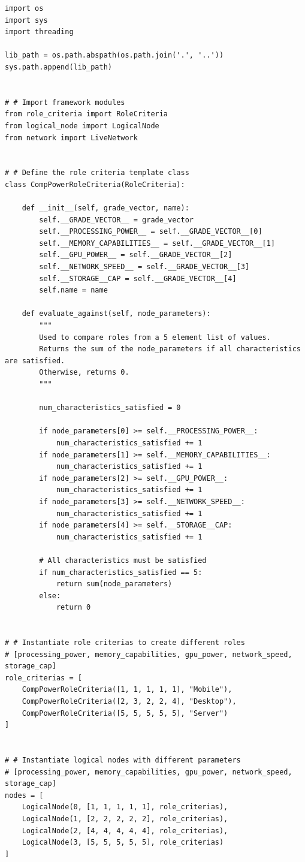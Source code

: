 \documentclass[11pt]{article}
\begin{document}
\lstset{frame=single, caption=Example Framework Listing in Python}
\begin{lstlisting}
import os
import sys
import threading

lib_path = os.path.abspath(os.path.join('.', '..'))
sys.path.append(lib_path)


# # Import framework modules
from role_criteria import RoleCriteria
from logical_node import LogicalNode
from network import LiveNetwork


# # Define the role criteria template class
class CompPowerRoleCriteria(RoleCriteria):

    def __init__(self, grade_vector, name):
        self.__GRADE_VECTOR__ = grade_vector
        self.__PROCESSING_POWER__ = self.__GRADE_VECTOR__[0]
        self.__MEMORY_CAPABILITIES__ = self.__GRADE_VECTOR__[1]
        self.__GPU_POWER__ = self.__GRADE_VECTOR__[2]
        self.__NETWORK_SPEED__ = self.__GRADE_VECTOR__[3]
        self.__STORAGE__CAP = self.__GRADE_VECTOR__[4]
        self.name = name

    def evaluate_against(self, node_parameters):
        """
        Used to compare roles from a 5 element list of values.
        Returns the sum of the node_parameters if all characteristics are satisfied.
        Otherwise, returns 0.
        """

        num_characteristics_satisfied = 0

        if node_parameters[0] >= self.__PROCESSING_POWER__:
            num_characteristics_satisfied += 1
        if node_parameters[1] >= self.__MEMORY_CAPABILITIES__:
            num_characteristics_satisfied += 1
        if node_parameters[2] >= self.__GPU_POWER__:
            num_characteristics_satisfied += 1
        if node_parameters[3] >= self.__NETWORK_SPEED__:
            num_characteristics_satisfied += 1
        if node_parameters[4] >= self.__STORAGE__CAP:
            num_characteristics_satisfied += 1

        # All characteristics must be satisfied
        if num_characteristics_satisfied == 5:
            return sum(node_parameters)
        else:
            return 0


# # Instantiate role criterias to create different roles
# [processing_power, memory_capabilities, gpu_power, network_speed, storage_cap]
role_criterias = [
    CompPowerRoleCriteria([1, 1, 1, 1, 1], "Mobile"),
    CompPowerRoleCriteria([2, 3, 2, 2, 4], "Desktop"),
    CompPowerRoleCriteria([5, 5, 5, 5, 5], "Server")
]


# # Instantiate logical nodes with different parameters
# [processing_power, memory_capabilities, gpu_power, network_speed, storage_cap]
nodes = [
    LogicalNode(0, [1, 1, 1, 1, 1], role_criterias),
    LogicalNode(1, [2, 2, 2, 2, 2], role_criterias),
    LogicalNode(2, [4, 4, 4, 4, 4], role_criterias),
    LogicalNode(3, [5, 5, 5, 5, 5], role_criterias)
]



\end{lstlisting}
\end{document}
